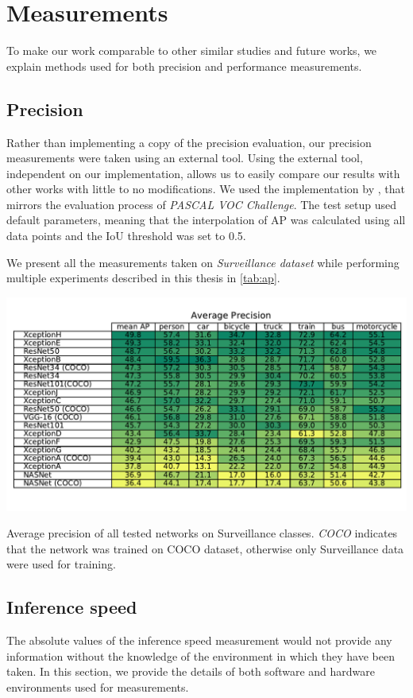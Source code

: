 \section{Measurements}
To make our work comparable to other similar studies and future works, we explain methods used for both precision and performance measurements.

\subsection{Precision}
Rather than implementing a copy of the precision evaluation, our precision measurements were taken using an external tool. Using the external tool, independent on our implementation, allows us to easily compare our results with other works with little to no modifications. We used the implementation by \citet{bib:metricsgit}, that mirrors the evaluation process of \textit{PASCAL VOC Challenge}. The test setup used default parameters, meaning that the interpolation of AP was calculated using all data points and the IoU threshold was set to 0.5. 

We present all the measurements taken on \textit{Surveillance dataset} while performing multiple experiments described in this thesis in \cref{tab:ap}.


\begin{table}[]
    \centering
    \includegraphics[width=\textwidth]{img/ap}
    \caption[Average precision of all tested networks on Surveillance classes]{Average precision of all tested networks on Surveillance classes. \textit{COCO} indicates that the network was trained on COCO dataset, otherwise only Surveillance data were used for training.} 
    \label{tab:ap}
\end{table}

\subsection{Inference speed}
The absolute values of the inference speed measurement would not provide any information without the knowledge of the environment in which they have been taken. In this section, we provide the details of both software and hardware environments used for measurements.

